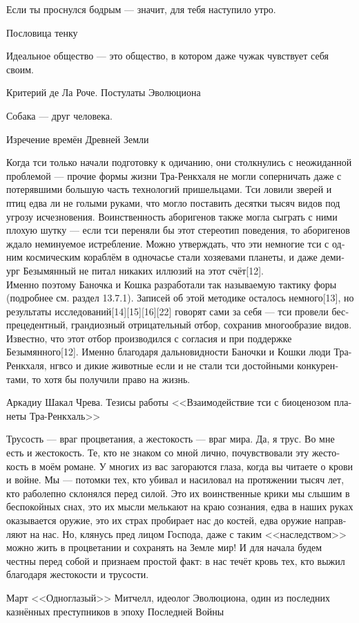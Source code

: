 \documentclass[a4paper,12pt,fleqn]{book}\usepackage{cooltooltips}\usepackage{polyglossia}\setdefaultlanguage[babelshorthands=true]{russian}\setotherlanguage{english}\defaultfontfeatures{Ligatures=TeX,Mapping=tex-text} \usepackage{xcolor}\definecolor{lightgray}{HTML}{bbbbbb}\color{lightgray}\newcommand{\ml}[3]{\textenglish{\textcolor{black}{#3}}}
\begin{document}
{\epigraph
{Если ты проснулся бодрым --- значит, для тебя наступило утро.}
{Пословица тенку}

\epigraph
{Идеальное общество --- это общество, в котором даже чужак чувствует себя своим.}
{Критерий де Ла Роче.
Постулаты Эволюциона}

\epigraph
{Собака --- друг человека.}
{Изречение времён Древней Земли}

\epigraph
{Когда тси только начали подготовку к одичанию, они столкнулись с неожиданной проблемой --- прочие формы жизни Тра-Ренкхаля не могли соперничать даже с потерявшими большую часть технологий пришельцами.
Тси ловили зверей и птиц едва ли не голыми руками, что могло поставить десятки тысяч видов под угрозу исчезновения.
Воинственность аборигенов также могла сыграть с ними плохую шутку --- если тси переняли бы этот стереотип поведения, то аборигенов ждало неминуемое истребление.
Можно утверждать, что эти немногие тси с одним космическим кораблём в одночасье стали хозяевами планеты, и даже демиург Безымянный не питал никаких иллюзий на этот счёт[12].\\
Именно поэтому Баночка и Кошка разработали так называемую тактику форы (подробнее см. раздел 13.7.1).
Записей об этой методике осталось немного[13], но результаты исследований[14][15][16][22] говорят сами за себя --- тси провели беспрецедентный, грандиозный отрицательный отбор, сохранив многообразие видов.
Известно, что этот отбор производился с согласия и при поддержке Безымянного[12].
Именно благодаря дальновидности Баночки и Кошки люди Тра-Ренкхаля, нгвсо и дикие животные если и не стали тси достойными конкурентами, то хотя бы получили право на жизнь.}
{Аркадиу Шакал Чрева.
Тезисы работы <<Взаимодействие тси с биоценозом планеты Тра-Ренкхаль>>}

\epigraph
{Трусость --- враг процветания, а жестокость --- враг мира.
Да, я трус.
Во мне есть и жестокость.
Те, кто не знаком со мной лично, почувствовали эту жестокость в моём романе.
У многих из вас загораются глаза, когда вы читаете о крови и войне.
Мы --- потомки тех, кто убивал и насиловал на протяжении тысяч лет, кто раболепно склонялся перед силой.
Это их воинственные крики мы слышим в беспокойных снах, это их мысли мелькают на краю сознания, едва в наших руках оказывается оружие, это их страх пробирает нас до костей, едва оружие направляют на нас.
Но, клянусь пред лицом Господа, даже с таким <<наследством>> можно жить в процветании и сохранять на Земле мир!
И для начала будем честны перед собой и признаем простой факт: в нас течёт кровь тех, кто выжил благодаря жестокости и трусости.}
{Март <<Одноглазый>> Митчелл, идеолог Эволюциона, один из последних казнённых преступников в эпоху Последней Войны}

}
\end{document}
